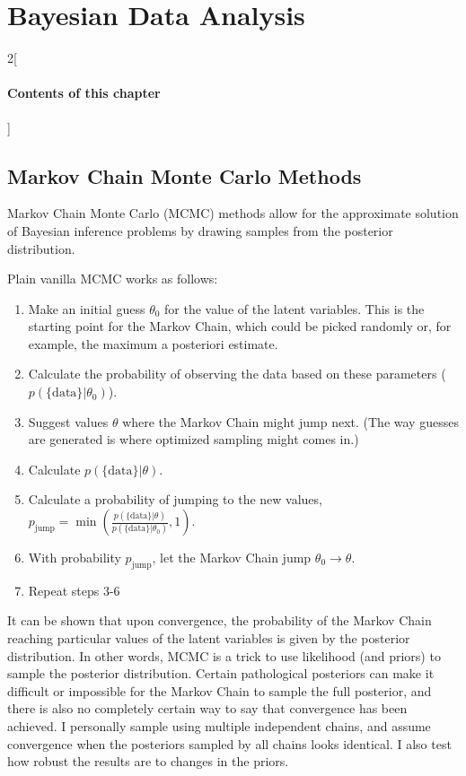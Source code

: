 \chapter{Bayesian Data Analysis}

\begin{multicols}{2}[\subsubsection*{Contents of this chapter}]
\end{multicols}


\section{Markov Chain Monte Carlo Methods}
Markov Chain Monte Carlo (MCMC) methods allow for the approximate solution of Bayesian inference problems by drawing samples from the posterior distribution.

Plain vanilla MCMC works as follows:

\begin{enumerate}
\item Make an initial guess $\theta_0$ for the value of the latent variables. This is the starting point for the Markov Chain, which could be picked randomly or, for example, the maximum a posteriori estimate.
\item Calculate the probability of observing the data based on these parameters ($p(\{\mathrm{data}\}|\theta_0)$).
\item Suggest values $\theta$ where the Markov Chain might jump next. (The way guesses are generated is where optimized sampling might comes in.)
\item Calculate $p(\{\mathrm{data}\}|\theta)$.
\item Calculate a probability of jumping to the new values, $p_{\mathrm{jump}} = \min\left(\frac{p(\{\mathrm{data}\}|\theta)}{p(\{\mathrm{data}\}|\theta_0)}, 1\right)$.
\item With probability $p_\mathrm{jump}$, let the Markov Chain jump $\theta_0 \rightarrow \theta$.
\item Repeat steps 3-6
\end{enumerate}

It can be shown that upon convergence, the probability of the Markov Chain reaching particular values of the latent variables is given by the posterior distribution. In other words, MCMC is a trick to use likelihood (and priors) to sample the posterior distribution. Certain pathological posteriors can make it difficult or impossible for the Markov Chain to sample the full posterior, and there is also no completely certain way to say that convergence has been achieved. I personally sample using multiple independent chains, and assume convergence when the posteriors sampled by all chains looks identical. I also test how robust the results are to changes in the priors.
